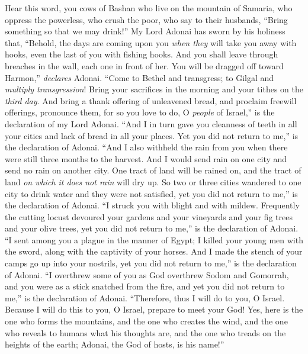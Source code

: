 \begin{biblechapter} %
 Hear this word, you cows of Bashan who live on the mountain of Samaria, who oppress the powerless, who crush the poor, who say to their husbands, “Bring something so that we may drink!”
\verse My Lord Adonai has sworn by his holiness that, “Behold, the days are coming upon you \textit{when they} will take you away with hooks, even the last of you with fishing hooks.
\verse And you shall leave through breaches in the wall, each one in front of her. You will be dragged off toward Harmon,” \textit{declares} Adonai.
\verse “Come to Bethel and transgress; to Gilgal and \textit{multiply transgression}! Bring your sacrifices in the morning and your tithes on the \textit{third day}.
\verse And bring a thank offering of unleavened bread, and proclaim freewill offerings, pronounce them, for so you love to do, O \textit{people} of Israel,” is the declaration of my Lord Adonai.
\verse “And I in turn gave you cleanness of teeth in all your cities and lack of bread in all your places. Yet you did not return to me,” is the declaration of Adonai.
\verse “And I also withheld the rain from you when there were still three months to the harvest. And I would send rain on one city and send no rain on another city. One tract of land will be rained on, and the tract of land \textit{on which it does not rain} will dry up.
\verse So two or three cities wandered to one city to drink water and they were not satisfied, yet you did not return to me,” is the declaration of Adonai.
\verse “I struck you with blight and with mildew. Frequently the cutting locust devoured your gardens and your vineyards and your fig trees and your olive trees, yet you did not return to me,” is the declaration of Adonai.
\verse “I sent among you a plague in the manner of Egypt; I killed your young men with the sword, along with the captivity of your horses. And I made the stench of your camps go up into your nostrils, yet you did not return to me,” is the declaration of Adonai.
\verse “I overthrew some of you as God overthrew Sodom and Gomorrah, and you were as a stick snatched from the fire, and yet you did not return to me,” is the declaration of Adonai.
\verse “Therefore, thus I will do to you, O Israel. Because I will do this to you, O Israel, prepare to meet your God!
\verse Yes, here is the one who forms the mountains, and the one who creates the wind, and the one who reveals to humans what his thoughts are, and the one who treads on the heights of the earth; Adonai, the God of hosts, is his name!”
\end{biblechapter}

